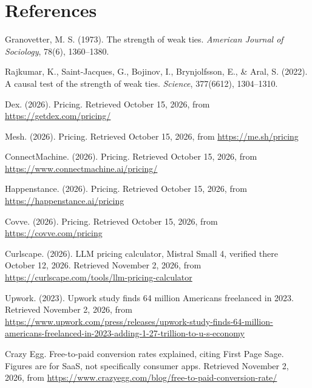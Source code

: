 \documentclass[11pt,letterpaper]{article}
\begin{document}
\section*{References}
\footnotesize
\begin{enumerate}[label={[\arabic*]},leftmargin=*,itemsep=0pt]
  \item Granovetter, M. S. (1973). The strength of weak ties. \textit{American Journal of Sociology}, 78(6), 1360--1380.
  \item Rajkumar, K., Saint-Jacques, G., Bojinov, I., Brynjolfsson, E., \& Aral, S. (2022). A causal test of the strength of weak ties. \textit{Science}, 377(6612), 1304--1310.
  \item Dex. (2026). Pricing. Retrieved October 15, 2026, from \url{https://getdex.com/pricing/}
  \item Mesh. (2026). Pricing. Retrieved October 15, 2026, from \url{https://me.sh/pricing}
  \item ConnectMachine. (2026). Pricing. Retrieved October 15, 2026, from \url{https://www.connectmachine.ai/pricing/}
  \item Happenstance. (2026). Pricing. Retrieved October 15, 2026, from \url{https://happenstance.ai/pricing}
  \item Covve. (2026). Pricing. Retrieved October 15, 2026, from \url{https://covve.com/pricing}
  \item Curlscape. (2026). LLM pricing calculator, Mistral Small 4, verified there October 12, 2026. Retrieved November 2, 2026, from \url{https://curlscape.com/tools/llm-pricing-calculator}
  \item Upwork. (2023). Upwork study finds 64 million Americans freelanced in 2023. Retrieved November 2, 2026, from \url{https://www.upwork.com/press/releases/upwork-study-finds-64-million-americans-freelanced-in-2023-adding-1-27-trillion-to-u-s-economy}
  \item Crazy Egg. Free-to-paid conversion rates explained, citing First Page Sage. Figures are for SaaS, not specifically consumer apps. Retrieved November 2, 2026, from \url{https://www.crazyegg.com/blog/free-to-paid-conversion-rate/}
\end{enumerate}
\end{document}
